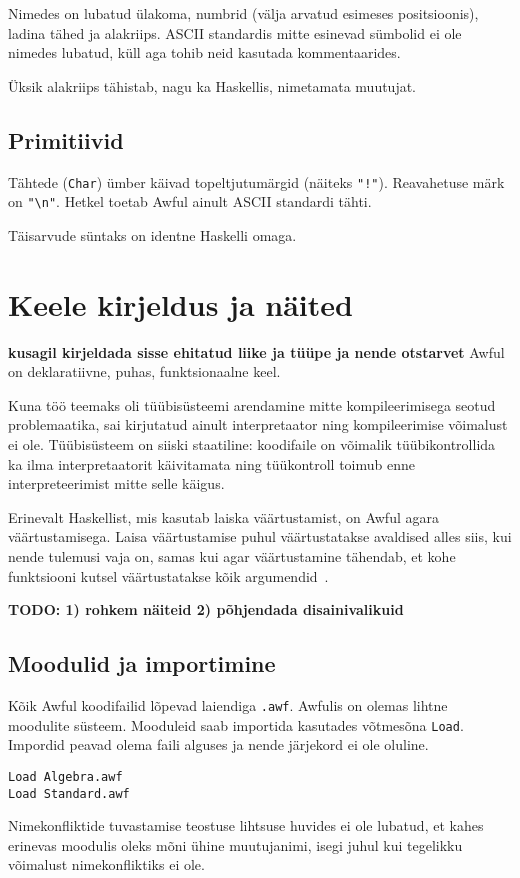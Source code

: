 \documentclass[12pt]{article}
\newcommand\peatykk[1]{
  \clearpage
  \section{#1}}
\newcommand\markus[1]{\textcolor{roheline}{\textbf{#1}}}
\begin{document}
      Nimedes on lubatud ülakoma, numbrid (välja arvatud esimeses positsioonis), ladina tähed ja alakriips. ASCII standardis mitte esinevad sümbolid ei ole nimedes lubatud, küll aga tohib neid kasutada kommentaarides.

      Üksik alakriips tähistab, nagu ka Haskellis, nimetamata muutujat.
    \subsection{Primitiivid}\label{primitiivid}
      Tähtede (\verb!Char!) ümber käivad topeltjutumärgid (näiteks \verb#"!"#). Reavahetuse märk on \verb!"\n"!. Hetkel toetab Awful ainult ASCII standardi tähti.

      Täisarvude süntaks on identne Haskelli omaga.
  \peatykk{Keele kirjeldus ja näited}\label{manual}
    \markus{kusagil kirjeldada sisse ehitatud liike ja tüüpe ja nende otstarvet} Awful on deklaratiivne, puhas, funktsionaalne keel.

    Kuna töö teemaks oli tüübisüsteemi arendamine mitte kompileerimisega seotud problemaatika, sai kirjutatud ainult interpretaator ning kompileerimise võimalust ei ole. Tüübisüsteem on siiski staatiline: koodifaile on võimalik tüübikontrollida ka ilma interpretaatorit käivitamata ning tüükontroll toimub enne interpreteerimist mitte selle käigus.

    Erinevalt Haskellist, mis kasutab laiska väärtustamist, on Awful agara väärtustamisega. Laisa väärtustamise puhul väärtustatakse avaldised alles siis, kui nende tulemusi vaja on, samas kui agar väärtustamine tähendab, et kohe funktsiooni kutsel väärtustatakse kõik argumendid~\cite{Sem}.

    \markus{TODO: 1) rohkem näiteid 2) põhjendada disainivalikuid}
    \subsection{Moodulid ja importimine}
      Kõik Awful koodifailid lõpevad laiendiga \verb!.awf!. Awfulis on olemas lihtne moodulite süsteem. Mooduleid saab importida kasutades võtmesõna \verb!Load!. Impordid peavad olema faili alguses ja nende järjekord ei ole oluline.

      \begin{verbatim}Load Algebra.awf
Load Standard.awf\end{verbatim}

      Nimekonfliktide tuvastamise teostuse lihtsuse huvides ei ole lubatud, et kahes erinevas moodulis oleks mõni ühine muutujanimi, isegi juhul kui tegelikku võimalust nimekonfliktiks ei ole.
\end{document}
